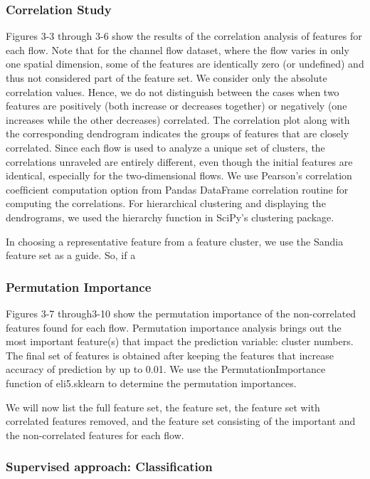 \subsubsection{Correlation Study}

Figures 3-3 through 3-6 show the results of the correlation analysis of features for each ﬂow. Note that for the channel ﬂow dataset, where the ﬂow varies in only one spatial dimension, some of the features are
identically zero (or undeﬁned) and thus not considered part of the feature set. We consider only the
absolute correlation values. Hence, we do not distinguish between the cases when two features are
positively (both increase or decreases together) or negatively (one increases while the other decreases)
correlated. The correlation plot along with the corresponding dendrogram indicates the groups of features
that are closely correlated. Since each ﬂow is used to analyze a unique set of clusters, the correlations
unraveled are entirely different, even though the initial features are identical, especially for the
two-dimensional ﬂows. We use Pearson’s correlation coefﬁcient computation option from Pandas
DataFrame correlation routine for computing the correlations. For hierarchical clustering and displaying
the dendrograms, we used the hierarchy function in SciPy’s clustering package.

In choosing a representative feature from a feature cluster, we use the Sandia feature set as a guide. So, if a

\subsubsection{Permutation Importance}

Figures 3-7 through3-10 show the permutation importance of the non-correlated features found for each
ﬂow. Permutation importance analysis brings out the most important feature(s) that impact the prediction
variable: cluster numbers. The ﬁnal set of features is obtained after keeping the features that increase
accuracy of prediction by up to 0.01. We use the PermutationImportance function of eli5.sklearn to
determine the permutation importances.

We will now list the full feature set, the feature set, the feature set with correlated features removed,
and the feature set consisting of the important and the non-correlated features for each ﬂow.

\subsubsection{Supervised approach: Classiﬁcation}

